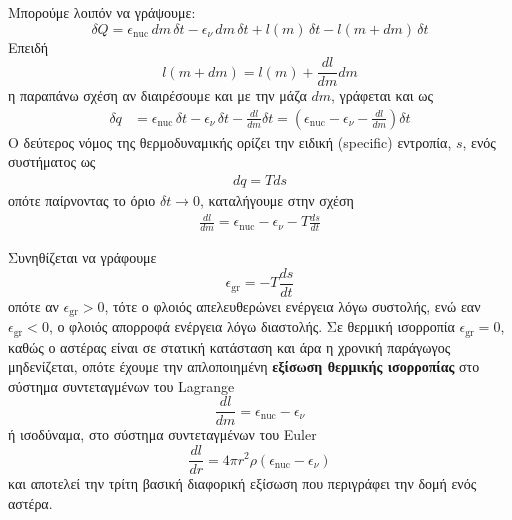 Μπορούμε λοιπόν να γράψουμε:
\begin{equation*}
    \delta Q = \epsilon_{\text{nuc}} \,dm \,\delta t - \epsilon_\nu \,dm \,\delta t + l(m) \,\delta t - l(m+dm) \,\delta t
\end{equation*}
Επειδή 
\begin{equation*}
    l(m+dm) = l(m) + \frac{dl}{dm}dm    
\end{equation*}
η παραπάνω σχέση αν διαιρέσουμε και με την μάζα $dm$, γράφεται και ως
\begin{align*}
    \delta q &= \epsilon_{\text{nuc}} \,\delta t - \epsilon_\nu \,\delta t - \frac{dl}{dm} \delta t = \left(\epsilon_{\text{nuc}} - \epsilon_\nu - \frac{dl}{dm}\right) \delta t
\end{align*}
Ο δεύτερος νόμος της θερμοδυναμικής ορίζει την ειδική (specific) εντροπία, $s$, ενός συστήματος ως
\begin{eqnarray}
    \label{eq:second_law_of_thermodynamics}
    dq = Tds
\end{eqnarray}
οπότε παίρνοντας το όριο $\delta t \rightarrow 0$, καταλήγουμε στην σχέση
\begin{eqnarray}
    \label{eq:thermal_equilibrium_lagrangian_with_entropy_term}
    \boxed{\frac{dl}{dm} = \epsilon_{\text{nuc}} - \epsilon_\nu - T \frac{ds}{dt}}
\end{eqnarray}

Συνηθίζεται να γράφουμε 
\begin{equation*}
    \epsilon_{\text{gr}} = -T \frac{ds}{dt}
\end{equation*}
οπότε αν $\epsilon_{\text{gr}} > 0$, τότε ο φλοιός απελευθερώνει ενέργεια λόγω συστολής, ενώ εαν $\epsilon_{\text{gr}} < 0$, ο φλοιός απορροφά ενέργεια λόγω διαστολής. Σε θερμική ισορροπία $\epsilon_{\text{gr}} = 0$, καθώς ο αστέρας είναι σε στατική κατάσταση και άρα η χρονική παράγωγος μηδενίζεται, οπότε έχουμε την απλοποιημένη \textbf{εξίσωση θερμικής ισορροπίας} στο σύστημα συντεταγμένων του Lagrange
\begin{equation}
    \label{eq:thermal_equilibrium_lagrangian_form}
    \boxed{\frac{dl}{dm} = \epsilon_{\text{nuc}} - \epsilon_\nu}
\end{equation}
ή ισοδύναμα, στο σύστημα συντεταγμένων του Euler
\begin{equation}
    \label{eq:thermal_equilibrium_eulerian_form}
    \boxed{\frac{dl}{dr} = 4\pi r^2 \rho \left( \epsilon_{\text{nuc}} - \epsilon_\nu \right)}
\end{equation}
και αποτελεί την τρίτη βασική διαφορική εξίσωση που περιγράφει την δομή ενός αστέρα.

